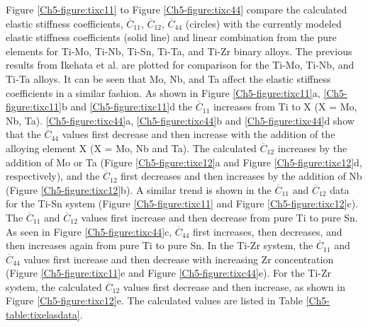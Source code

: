 Figure \ref{Ch5-figure:tixc11} to Figure \ref{Ch5-figure:tixc44} compare the calculated elastic stiffness coefficients, $\overline{C}_{11}$, $\overline{C}_{12}$, $\overline{C}_{44}$ (circles) with the currently modeled elastic stiffness coefficients (solid line) and linear combination from the pure elements for Ti-Mo, Ti-Nb, Ti-Sn, Ti-Ta, and Ti-Zr binary alloys. The previous results from Ikehata et al. \cite{Ikehata2004} are plotted for comparison for the Ti-Mo, Ti-Nb, and Ti-Ta alloys. It can be seen that Mo, Nb, and Ta affect the elastic stiffness coefficients in a similar fashion. As shown in Figure \ref{Ch5-figure:tixc11}a, \ref{Ch5-figure:tixc11}b and \ref{Ch5-figure:tixc11}d the $\overline{C}_{11}$ increases from Ti to X (X = Mo, Nb, Ta). \ref{Ch5-figure:tixc44}a, \ref{Ch5-figure:tixc44}b and \ref{Ch5-figure:tixc44}d show that the $\overline{C}_{44}$ values first decrease and then increase with the addition of the alloying element X (X = Mo, Nb and Ta). The calculated $\overline{C}_{12}$ increases by the addition of Mo or Ta (Figure \ref{Ch5-figure:tixc12}a and Figure \ref{Ch5-figure:tixc12}d, respectively), and the $\overline{C}_{12}$ first decreases and then increases by the addition of Nb (Figure \ref{Ch5-figure:tixc12}b). A similar trend is shown in the $\overline{C}_{11}$ and $\overline{C}_{12}$ data for the Ti-Sn system (Figure \ref{Ch5-figure:tixc11} and Figure \ref{Ch5-figure:tixc12}c). The $\overline{C}_{11}$ and $\overline{C}_{12}$ values first increase and then decrease from pure Ti to pure Sn. As seen in Figure \ref{Ch5-figure:tixc44}c, $\overline{C}_{44}$ first increases, then decreases, and then increases again from pure Ti to pure Sn. In the Ti-Zr system, the $\overline{C}_{11}$ and $\overline{C}_{44}$ values first increase and then decrease with increasing Zr concentration (Figure \ref{Ch5-figure:tixc11}e and Figure \ref{Ch5-figure:tixc44}e). For the Ti-Zr system, the calculated $\overline{C}_{12}$ values first decrease and then increase, as shown in Figure \ref{Ch5-figure:tixc12}e. The calculated values are listed in Table \ref{Ch5-table:tixelasdata}.

